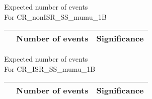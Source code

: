 \begin{frame}{Expected number of events \\ For CR\_nonISR\_SS\_mumu\_1B}
\vspace{5mm}
\begin{tabular}{|c|c|c|}
\hline
& Number of events & Significance \\
\hline

\end{tabular}
\end{frame}

\begin{frame}{Expected number of events \\ For CR\_ISR\_SS\_mumu\_1B}
\vspace{5mm}
\begin{tabular}{|c|c|c|}
\hline
& Number of events & Significance \\
\hline

\end{tabular}
\end{frame}

